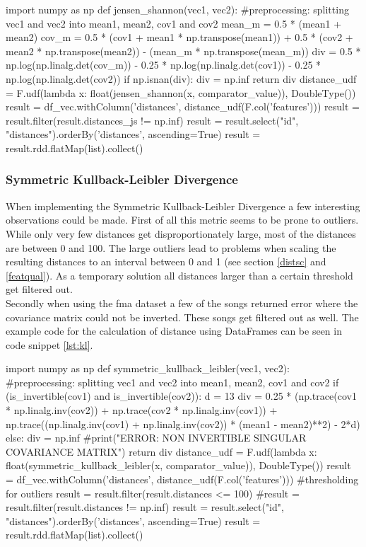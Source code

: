 \begin{pythonCode}[frame=single,label={lst:js},caption={Jensen-Shannon-like Divergence},captionpos=b]
import numpy as np
def jensen_shannon(vec1, vec2):
	#preprocessing: splitting vec1 and vec2 into mean1, mean2, cov1 and cov2
	mean_m = 0.5 * (mean1 + mean2)
	cov_m = 0.5 * (cov1 + mean1 * np.transpose(mean1)) + 0.5 * 
		(cov2 + mean2 * np.transpose(mean2)) - (mean_m * np.transpose(mean_m))
	div = 0.5 * np.log(np.linalg.det(cov_m)) - 0.25 * np.log(np.linalg.det(cov1)) - 
		0.25 * np.log(np.linalg.det(cov2))  
	if np.isnan(div):
		div = np.inf
	return div
distance_udf = F.udf(lambda x: float(jensen_shannon(x, comparator_value)), 
	DoubleType())
result = df_vec.withColumn('distances', distance_udf(F.col('features')))
result = result.filter(result.distances_js != np.inf)    
result = result.select("id", "distances").orderBy('distances', ascending=True)
result = result.rdd.flatMap(list).collect()
\end{pythonCode}

\subsubsection{Symmetric Kullback-Leibler Divergence}\label{sparkskl}

When implementing the Symmetric Kullback-Leibler Divergence a few interesting observations could be made. First of all this metric seems to be prone to outliers. While only very few distances get disproportionately large, most of the distances are between 0 and 100. The large outliers lead to problems when scaling the resulting distances to an interval between 0 and 1 (see section \ref{distsc} and \ref{featqual}). As a temporary solution all distances larger than a certain threshold get filtered out.\\ 
Secondly when using the fma dataset a few of the songs returned error where the covariance matrix could not be inverted. 
These songs get filtered out as well. The example code for the calculation of distance using DataFrames can be seen in code snippet \ref{lst:kl}. 

\begin{pythonCode}[frame=single,label={lst:kl},caption={Kullback-Leibler Divergence},captionpos=b]
import numpy as np
def symmetric_kullback_leibler(vec1, vec2):
	#preprocessing: splitting vec1 and vec2 into mean1, mean2, cov1 and cov2
	if (is_invertible(cov1) and is_invertible(cov2)):
		d = 13
		div = 0.25 * (np.trace(cov1 * np.linalg.inv(cov2)) + 
			np.trace(cov2 * np.linalg.inv(cov1)) + 
			np.trace((np.linalg.inv(cov1) + 
			np.linalg.inv(cov2)) * (mean1 - mean2)**2) - 2*d)
	else: 
		div = np.inf
		#print("ERROR: NON INVERTIBLE SINGULAR COVARIANCE MATRIX\n")  
	return div
distance_udf = F.udf(lambda x: float(symmetric_kullback_leibler(x, comparator_value)), DoubleType())
result = df_vec.withColumn('distances', distance_udf(F.col('features')))
#thresholding for outliers
result = result.filter(result.distances <= 100)  
#result = result.filter(result.distances != np.inf)        
result = result.select("id", "distances").orderBy('distances', ascending=True)
result = result.rdd.flatMap(list).collect()
\end{pythonCode}

